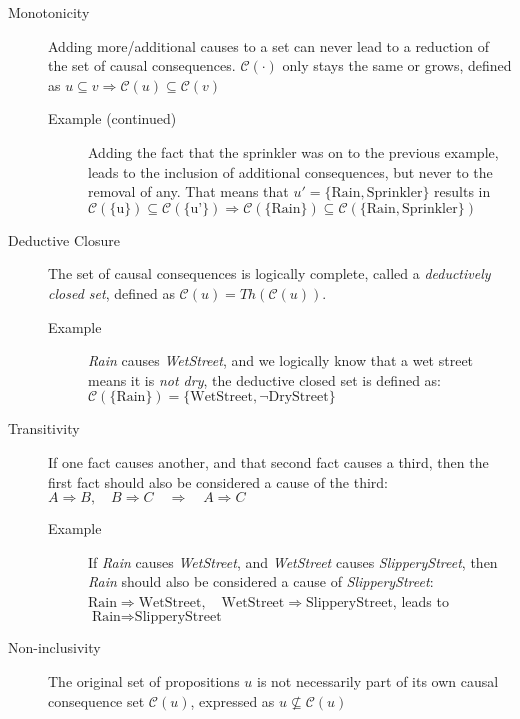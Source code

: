 \documentclass[seminar,palatino,english]{AIGpaper}
\begin{document}
\begin{description}
    \item[Monotonicity] Adding more/additional causes to a set can never lead to a reduction of the set of causal consequences. $\mathcal{C}(\cdot)$ only stays the same or grows, defined as $ u \subseteq v \Rightarrow \mathcal{C}(u) \subseteq \mathcal{C}(v) $
    \begin{description}
        \item[Example (continued)] Adding the fact that the sprinkler was on to the previous example, leads to the inclusion of additional consequences, but never to the removal of any. That means that $u' = \{\text{Rain}, \text{Sprinkler}\} $ results in $  \mathcal{C}(\{\text{u}\}) \subseteq \mathcal{C}(\{\text{u'}\}) \Rightarrow \mathcal{C}(\{\text{Rain}\}) \subseteq \mathcal{C}(\{\text{Rain}, \text{Sprinkler}\})$
    \end{description}
    \item[Deductive Closure] The set of causal consequences is logically complete, called a \emph{deductively closed set}, defined as $\mathcal{C}(u) = Th(\mathcal{C}(u))$. 
    \begin{description}
        \item[Example] \textit{Rain} causes \textit{WetStreet}, and we logically know that a wet street means it is \textit{not dry}, the deductive closed set is defined as: $\mathcal{C}(\{\text{Rain}\}) = \{\text{WetStreet}, \neg \text{DryStreet}\} $
    \end{description}
    \item[Transitivity] If one fact causes another, and that second fact causes a third, then the first fact should also be considered a cause of the third: $A \Rightarrow B, \quad B \Rightarrow C \quad \Rightarrow \quad A \Rightarrow C$
    \begin{description}
        \item[Example] If \textit{Rain} causes \textit{WetStreet}, and \textit{WetStreet} causes \textit{SlipperyStreet}, then \textit{Rain} should also be considered a cause of \textit{SlipperyStreet}: $\text{Rain} \Rightarrow \text{WetStreet}, \quad \text{WetStreet} \Rightarrow \text{SlipperyStreet}$, leads to $ \text{Rain} \Rightarrow \text{SlipperyStreet}$
    \end{description}  
    \item[Non-inclusivity] The original set of propositions $ u $ is not necessarily part of its own causal consequence set $ \mathcal{C}(u) $, expressed as $ u \nsubseteq \mathcal{C}(u) $

\end{description}
\end{document}
